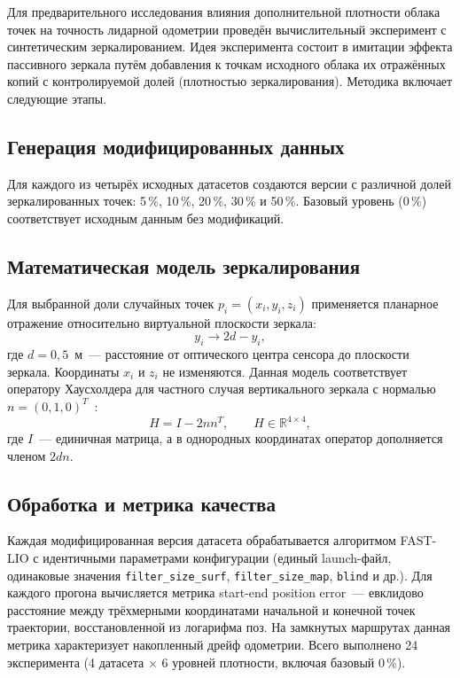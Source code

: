 \documentclass{misisarticle}
\begin{document}
Для предварительного исследования влияния дополнительной плотности облака точек на точность лидарной одометрии проведён вычислительный эксперимент с синтетическим зеркалированием. Идея эксперимента состоит в имитации эффекта пассивного зеркала путём добавления к точкам исходного облака их отражённых копий с контролируемой долей (плотностью зеркалирования). Методика включает следующие этапы.

\subsection{Генерация модифицированных данных}

Для каждого из четырёх исходных датасетов создаются версии с различной долей зеркалированных точек: 5\,\%, 10\,\%, 20\,\%, 30\,\% и 50\,\%. Базовый уровень (0\,\%) соответствует исходным данным без модификаций.

\subsection{Математическая модель зеркалирования}

Для выбранной доли случайных точек $p_i=(x_i,y_i,z_i)$ применяется планарное отражение относительно виртуальной плоскости зеркала:
\begin{equation}
  y_i \rightarrow 2d - y_i,
  \label{eq:mirror}
\end{equation}
где $d=0{,}5$~м~--- расстояние от оптического центра сенсора до плоскости зеркала. Координаты $x_i$ и $z_i$ не изменяются. Данная модель соответствует оператору Хаусхолдера для частного случая вертикального зеркала с нормалью $n=(0,1,0)^T$~\cite{vishnevsky2026}:
\begin{equation}
  H = I - 2nn^T, \qquad H \in \mathbb{R}^{4\times4},
  \label{eq:householder}
\end{equation}
где $I$~--- единичная матрица, а в однородных координатах оператор дополняется членом $2dn$.

\subsection{Обработка и метрика качества}

Каждая модифицированная версия датасета обрабатывается алгоритмом FAST-LIO с идентичными параметрами конфигурации (единый launch-файл, одинаковые значения \texttt{filter\_size\_surf}, \texttt{filter\_size\_map}, \texttt{blind} и др.). Для каждого прогона вычисляется метрика start-end position error~--- евклидово расстояние между трёхмерными координатами начальной и конечной точек траектории, восстановленной из логарифма поз. На замкнутых маршрутах данная метрика характеризует накопленный дрейф одометрии. Всего выполнено 24 эксперимента (4 датасета $\times$ 6 уровней плотности, включая базовый 0\,\%).
\end{document}
